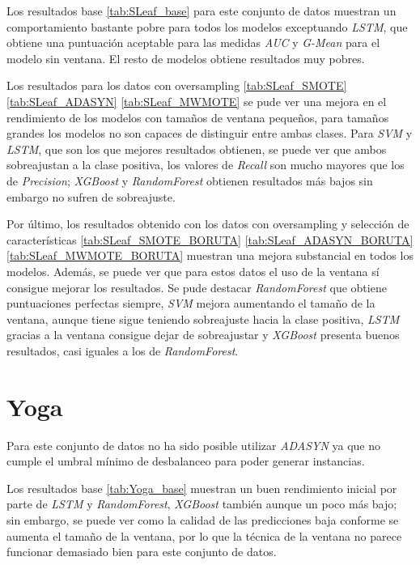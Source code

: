 Los resultados base \ref{tab:SLeaf_base} para este conjunto de datos muestran un comportamiento bastante pobre para todos los modelos exceptuando \textit{LSTM}, que obtiene una puntuación aceptable para las medidas \textit{AUC} y \textit{G-Mean} para el modelo sin ventana. El resto de modelos obtiene resultados muy pobres.\newline

Los resultados para los datos con oversampling \ref{tab:SLeaf_SMOTE} \ref{tab:SLeaf_ADASYN} \ref{tab:SLeaf_MWMOTE} se pude ver una mejora en el rendimiento de los modelos con tamaños de ventana pequeños, para tamaños grandes los modelos no son capaces de distinguir entre ambas clases. Para \textit{SVM} y \textit{LSTM}, que son los que mejores resultados obtienen, se puede ver que ambos sobreajustan a la clase positiva, los valores de \textit{Recall} son mucho mayores que los de \textit{Precision}; \textit{XGBoost} y \textit{RandomForest} obtienen resultados más bajos sin embargo no sufren de sobreajuste.\newline

Por último, los resultados obtenido con los datos con oversampling y selección de características \ref{tab:SLeaf_SMOTE_BORUTA} \ref{tab:SLeaf_ADASYN_BORUTA} \ref{tab:SLeaf_MWMOTE_BORUTA} muestran una mejora substancial en todos los modelos. Además, se puede ver que para estos datos el uso de la ventana sí consigue mejorar los resultados. Se pude destacar \textit{RandomForest} que obtiene puntuaciones perfectas siempre, \textit{SVM} mejora aumentando el tamaño de la ventana, aunque tiene sigue teniendo sobreajuste hacia la clase positiva, \textit{LSTM} gracias a la ventana consigue dejar de sobreajustar y \textit{XGBoost} presenta buenos resultados, casi iguales a los de \textit{RandomForest}.

\section{Yoga}
Para este conjunto de datos no ha sido posible utilizar \textit{ADASYN} ya que no cumple el umbral mínimo de desbalanceo para poder generar instancias.\newline

Los resultados base \ref{tab:Yoga_base} muestran un buen rendimiento inicial por parte de \textit{LSTM} y \textit{RandomForest}, \textit{XGBoost} también aunque un poco más bajo; sin embargo, se puede ver como la calidad de las predicciones baja conforme se aumenta el tamaño de la ventana, por lo que la técnica de la ventana no parece funcionar demasiado bien para este conjunto de datos.\newline


